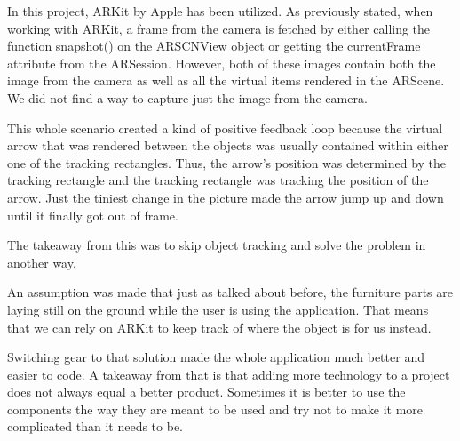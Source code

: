 In this project, ARKit by Apple has been utilized. As previously stated, when working with ARKit, a frame from the camera is fetched by either calling the function snapshot() on the ARSCNView object or getting the currentFrame attribute from the ARSession.
However, both of these images contain both the image from the camera as well as all the virtual items rendered in the ARScene. We did not find a way to capture just the image from  the camera.

This whole scenario created a kind of positive feedback loop because the virtual arrow that was rendered between the objects was usually contained within either one of the tracking rectangles. Thus, the arrow's position was determined by the tracking rectangle and the tracking rectangle was tracking the position of the arrow.
Just the tiniest change in the picture made the arrow jump up and down until it finally got out of frame.

The takeaway from this was to skip object tracking and solve the problem in another way.

An assumption was made that just as talked about before, the furniture parts are laying still on the ground while the user is using the application. That means that we can rely on ARKit to keep track of where the object is for us instead.

Switching gear to that solution made the whole application much better and easier to code. A takeaway from that is that adding more technology to a project does not always equal a better product. Sometimes it is better to use the components the way they are meant to be used and try not to make it more complicated than it needs to be.

\newpage